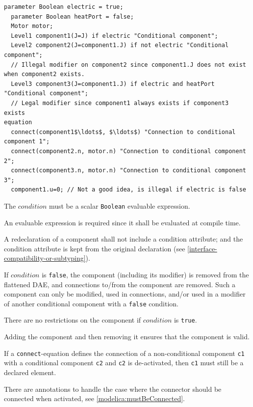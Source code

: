 \begin{example}
\begin{lstlisting}[language=modelica]
  parameter Boolean electric = true;
  parameter Boolean heatPort = false;
  Motor motor;
  Level1 component1(J=J) if electric "Conditional component";
  Level2 component2(J=component1.J) if not electric "Conditional component";
  // Illegal modifier on component2 since component1.J does not exist when component2 exists.
  Level3 component3(J=component1.J) if electric and heatPort "Conditional component";
  // Legal modifier since component1 always exists if component3 exists
equation
  connect(component1$\ldots$, $\ldots$) "Connection to conditional component 1";
  connect(component2.n, motor.n) "Connection to conditional component 2";
  connect(component3.n, motor.n) "Connection to conditional component 3";
  component1.u=0; // Not a good idea, is illegal if electric is false
\end{lstlisting}
\end{example}

The $\mathit{condition}$ must be a scalar \lstinline!Boolean! evaluable expression.

\begin{nonnormative}
An evaluable expression is required since it shall be evaluated at compile time.
\end{nonnormative}

A redeclaration of a component shall not include a condition attribute; and the condition attribute is kept from the original declaration (see
\cref{interface-compatibility-or-subtyping}).

If $\mathit{condition}$ is \lstinline!false!, the component (including its modifier) is removed from the flattened DAE, and connections to/from the component are removed.
Such a component can only be modified, used in connections, and/or used in a modifier of another conditional component with a \lstinline!false! condition.

There are no restrictions on the component if $\mathit{condition}$ is \lstinline!true!.

\begin{nonnormative}
Adding the component and then removing it ensures that the component is valid.

If a \lstinline!connect!-equation defines the connection of a non-conditional component \lstinline!c1! with a conditional component \lstinline!c2! and \lstinline!c2! is de-activated, then \lstinline!c1! must still be a declared element.

There are annotations to handle the case where the connector should be connected when activated, see \cref{modelica:mustBeConnected}.
\end{nonnormative}


